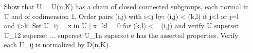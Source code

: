Show that U = U(n,K) has a chain of closed connected subgroups, each normal in U and of codimension 1. Order pairs (i,j) with i<j by: (i,j) < (k,l) if j<l or j=l and i>k. Set U_{ij} = {x in U | x_{kl} = 0 for (k,l) <= (i,j)} and verify U superset U_{12} superset ... superset U_{1n} superset e has the asserted properties. Verify each U_{ij} is normalized by D(n,K).
